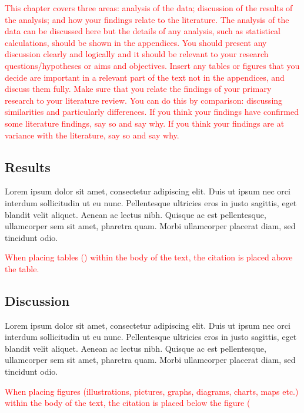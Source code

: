 \textcolor{red}{This chapter covers three areas: analysis of the data; discussion of the results of the analysis; and how your findings relate to the literature. The analysis of the data can be discussed here but the details of any analysis, such as statistical calculations, should be shown in the appendices. You should present any discussion clearly and logically and it should be relevant to your research questions/hypotheses or aims and objectives. Insert any tables or figures that you decide are important in a relevant part of the text not in the appendices, and discuss them fully. Make sure that you relate the findings of your primary research to your literature review. You can do this by comparison: discussing similarities and particularly differences. If you think your findings have confirmed some literature findings, say so and say why. If you think your findings are at variance with the literature, say so and say why.}

\subsection{Results}
Lorem ipsum dolor sit amet, consectetur adipiscing elit. Duis ut ipsum nec orci interdum sollicitudin ut eu nunc. Pellentesque ultricies eros in justo sagittis, eget blandit velit aliquet. Aenean ac lectus nibh. Quisque ac est pellentesque, ullamcorper sem sit amet, pharetra quam. Morbi ullamcorper placerat diam, sed tincidunt odio.

\textcolor{red}{When placing tables () within the body of the text, the citation is placed above the table.} 

\vfill

\newpage 

\subsection{Discussion}
Lorem ipsum dolor sit amet, consectetur adipiscing elit. Duis ut ipsum nec orci interdum sollicitudin ut eu nunc. Pellentesque ultricies eros in justo sagittis, eget blandit velit aliquet. Aenean ac lectus nibh. Quisque ac est pellentesque, ullamcorper sem sit amet, pharetra quam. Morbi ullamcorper placerat diam, sed tincidunt odio.

\textcolor{red}{When placing figures (illustrations, pictures, graphs, diagrams, charts, maps etc.) within the body of the text, the citation is placed below the figure (}